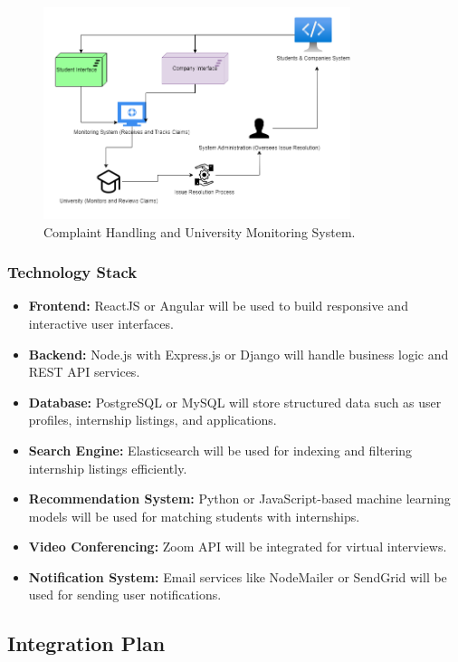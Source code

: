 \begin{figure}[H]
\centering
\includegraphics[width=0.8\textwidth]{Images/core5.png}
\caption{Complaint Handling and University Monitoring System.}
\end{figure}

\subsubsection{Technology Stack}

\begin{itemize}
    \item \textbf{Frontend:} ReactJS or Angular will be used to build responsive and interactive user interfaces.
    \item \textbf{Backend:} Node.js with Express.js or Django will handle business logic and REST API services.
    \item \textbf{Database:} PostgreSQL or MySQL will store structured data such as user profiles, internship listings, and applications.
    \item \textbf{Search Engine:} Elasticsearch will be used for indexing and filtering internship listings efficiently.
    \item \textbf{Recommendation System:} Python or JavaScript-based machine learning models will be used for matching students with internships.
    \item \textbf{Video Conferencing:} Zoom API will be integrated for virtual interviews.
    \item \textbf{Notification System:} Email services like NodeMailer or SendGrid will be used for sending user notifications.
\end{itemize}

\subsection{Integration Plan}

